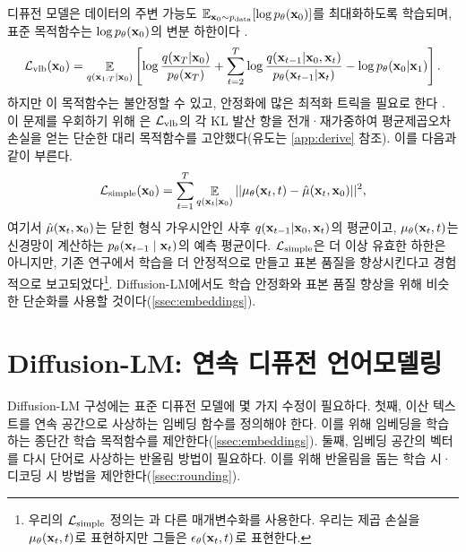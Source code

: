 디퓨전 모델은 데이터의 주변 가능도 $\mathbb{E}_{\mathbf{x}_{0} \sim p_\text{data} }[\log p_\theta(\mathbf{x}_{0})]$를 최대화하도록 학습되며, 표준 목적함수는 $\log p_\theta(\mathbf{x}_{0})$의 변분 하한이다 \cite{pmlr-v37-sohl-dickstein15}.
\begin{equation}
\mathcal{L}_\text{vlb} (\mathbf{x}_{0}) = \mathop{\mathbb{E}}_{q(\mathbf{x}_{1:T} | \mathbf{x}_{0})} \left[\log \frac{q(\mathbf{x}_{T} | \mathbf{x}_{0})}{p_\theta(\mathbf{x}_{T})} + \sum_{t=2}^T \log \frac{q(\mathbf{x}_{t-1} | \mathbf{x}_{0},\mathbf{x}_{t})} {p_\theta(\mathbf{x}_{t-1} | \mathbf{x}_{t}) } - \log p_\theta( \mathbf{x}_{0} | \mathbf{x}_{1})\right].
\label{eqn:diffusion}
\end{equation}
하지만 이 목적함수는 불안정할 수 있고, 안정화에 많은 최적화 트릭을 필요로 한다 \cite{nichol2021improved}. 이 문제를 우회하기 위해 \citet{ho2020denoising}은 $\mathcal{L}_\text{vlb}$의 각 KL 발산 항을 전개·재가중하여 평균제곱오차 손실을 얻는 단순한 대리 목적함수를 고안했다(유도는 \cref{app:derive} 참조). 이를 다음과 같이 부른다.
\[\mathcal{L}_\text{simple} (\mathbf{x}_{0}) = \sum_{t=1}^T \mathop{\mathbb{E}}_{q(\mathbf{x}_{t} \mid \mathbf{x}_{0})} || \mu_\theta(\mathbf{x}_{t}, t) - \hat{\mu}(\mathbf{x}_{t}, \mathbf{x}_{0}) ||^2,\]
여기서 $\hat{\mu}(\mathbf{x}_{t}, \mathbf{x}_{0})$는 닫힌 형식 가우시안인 사후 $q(\mathbf{x}_{t-1} | \mathbf{x}_{0},\mathbf{x}_{t})$의 평균이고, $\mu_\theta(\mathbf{x}_{t}, t)$는 신경망이 계산하는 $p_\theta(\mathbf{x}_{t-1} \mid \mathbf{x}_{t})$의 예측 평균이다.
$\mathcal{L}_\text{simple}$은 더 이상 유효한 하한은 아니지만, 기존 연구에서 학습을 더 안정적으로 만들고 표본 품질을 향상시킨다고 경험적으로 보고되었다\footnote{우리의 $\mathcal{L}_\text{simple}$ 정의는 \citet{ho2020denoising}과 다른 매개변수화를 사용한다. 우리는 제곱 손실을 $\mu_\theta(\mathbf{x}_{t}, t)$로 표현하지만 그들은 $\epsilon_\theta(\mathbf{x}_{t}, t)$로 표현한다.}.
Diffusion-LM에서도 학습 안정화와 표본 품질 향상을 위해 비슷한 단순화를 사용할 것이다(\cref{ssec:embeddings}).














\vspace{-2mm}
\section{Diffusion-LM: 연속 디퓨전 언어모델링}
\vspace{-2mm}
\label{sec:method}

Diffusion-LM 구성에는 표준 디퓨전 모델에 몇 가지 수정이 필요하다.
첫째, 이산 텍스트를 연속 공간으로 사상하는 임베딩 함수를 정의해야 한다. 이를 위해 임베딩을 학습하는 종단간 학습 목적함수를 제안한다(\cref{ssec:embeddings}).
둘째, 임베딩 공간의 벡터를 다시 단어로 사상하는 반올림 방법이 필요하다. 이를 위해 반올림을 돕는 학습 시·디코딩 시 방법을 제안한다(\cref{ssec:rounding}).








